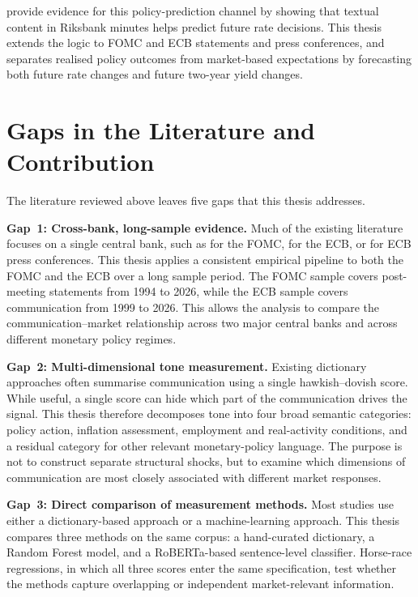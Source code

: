 \citet{apel2014} provide evidence for this policy-prediction channel by
showing that textual content in Riksbank minutes helps predict future
rate decisions. This thesis extends the logic to FOMC and ECB statements
and press conferences, and separates realised policy outcomes from
market-based expectations by forecasting both future rate changes and
future two-year yield changes.

\section{Gaps in the Literature and Contribution}
\label{sec:lit_gaps}

The literature reviewed above leaves five gaps that this thesis
addresses.

\textbf{Gap~1: Cross-bank, long-sample evidence.} Much of the
existing literature focuses on a single central bank, such as
\citet{lucca2009} for the FOMC, \citet{picault2017} for the ECB, or
\citet{schmeling2019} for ECB press conferences. This thesis applies a
consistent empirical pipeline to both the FOMC and the ECB over a long
sample period. The FOMC sample covers post-meeting statements from
1994 to 2026, while the ECB sample covers communication from 1999 to
2026. This allows the analysis to compare the communication--market
relationship across two major central banks and across different
monetary policy regimes.

\textbf{Gap~2: Multi-dimensional tone measurement.} Existing
dictionary approaches often summarise communication using a single
hawkish--dovish score. While useful, a single score can hide which part
of the communication drives the signal. This thesis therefore decomposes
tone into four broad semantic categories: policy action, inflation
assessment, employment and real-activity conditions, and a residual
category for other relevant monetary-policy language. The purpose is not
to construct separate structural shocks, but to examine which dimensions
of communication are most closely associated with different market
responses.

\textbf{Gap~3: Direct comparison of measurement methods.} Most studies
use either a dictionary-based approach or a machine-learning approach.
This thesis compares three methods on the same corpus: a hand-curated
dictionary, a Random Forest model, and a RoBERTa-based sentence-level
classifier. Horse-race regressions, in which all three scores enter the
same specification, test whether the methods capture overlapping or
independent market-relevant information.


